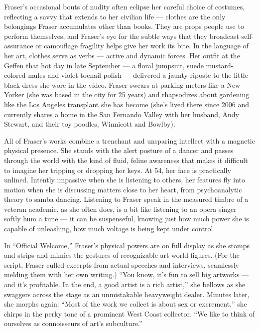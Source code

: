 Fraser's occasional bouts of nudity often eclipse her careful choice of
costumes, reflecting a savvy that extends to her civilian life ---
clothes are the only belongings Fraser accumulates other than books.
They are props people use to perform themselves, and Fraser's eye for
the subtle ways that they broadcast self-assurance or camouflage
fragility helps give her work its bite. In the language of her art,
clothes serve as verbs --- active and dynamic forces. Her outfit at the
Geffen that hot day in late September --- a floral jumpsuit, suede
mustard-colored mules and violet toenail polish --- delivered a jaunty
riposte to the little black dress she wore in the video. Fraser swears
at parking meters like a New Yorker (she was based in the city for 25
years) and rhapsodizes about gardening like the Los Angeles transplant
she has become (she's lived there since 2006 and currently shares a home
in the San Fernando Valley with her husband, Andy Stewart, and their toy
poodles, Winnicott and Bowlby).

All of Fraser's works combine a trenchant and unsparing intellect with a
magnetic physical presence. She stands with the alert posture of a
dancer and passes through the world with the kind of fluid, feline
awareness that makes it difficult to imagine her tripping or dropping
her keys. At 54, her face is practically unlined. Intently impassive
when she is listening to others, her features fly into motion when she
is discussing matters close to her heart, from psychoanalytic theory to
samba dancing. Listening to Fraser speak in the measured timbre of a
veteran academic, as she often does, is a bit like listening to an opera
singer softly hum a tune --- it can be suspenseful, knowing just how
much power she is capable of unleashing, how much voltage is being kept
under control.

In ``Official Welcome,'' Fraser's physical powers are on full display as
she stomps and strips and mimics the gestures of recognizable art-world
figures. (For the script, Fraser culled excerpts from actual speeches
and interviews, seamlessly melding them with her own writing.) ``You
know, it's fun to sell big artworks --- and it's profitable. In the end,
a good artist is a rich artist,'' she bellows as she swaggers across the
stage as an unmistakable heavyweight dealer. Minutes later, she morphs
again: ``Most of the work we collect is about sex or excrement,'' she
chirps in the perky tone of a prominent West Coast collector. ``We like
to think of ourselves as connoisseurs of art's subculture.''

